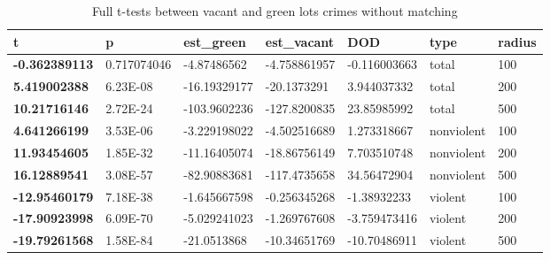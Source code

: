 \documentclass{article}
\begin{document}
\begin{table}[]
\begin{center}
\caption{\label{tab:ab}Full t-tests between vacant and green lots crimes without matching}
\begin{tabular}{lllllll}
\hline
\textbf{t}            & \textbf{p}  & \textbf{est\_green} & \textbf{est\_vacant} & \textbf{DOD} & \textbf{type} & \textbf{radius} \\ \hline
\textbf{-0.362389113} & 0.717074046 & -4.87486562         & -4.758861957         & -0.116003663 & total         & 100             \\
\textbf{5.419002388}  & 6.23E-08    & -16.19329177        & -20.1373291          & 3.944037332  & total         & 200             \\
\textbf{10.21716146}  & 2.72E-24    & -103.9602236        & -127.8200835         & 23.85985992  & total         & 500             \\
\textbf{4.641266199}  & 3.53E-06    & -3.229198022        & -4.502516689         & 1.273318667  & nonviolent    & 100             \\
\textbf{11.93454605}  & 1.85E-32    & -11.16405074        & -18.86756149         & 7.703510748  & nonviolent    & 200             \\
\textbf{16.12889541}  & 3.08E-57    & -82.90883681        & -117.4735658         & 34.56472904  & nonviolent    & 500             \\
\textbf{-12.95460179} & 7.18E-38    & -1.645667598        & -0.256345268         & -1.38932233  & violent       & 100             \\
\textbf{-17.90923998} & 6.09E-70    & -5.029241023        & -1.269767608         & -3.759473416 & violent       & 200             \\
\textbf{-19.79261568} & 1.58E-84    & -21.0513868         & -10.34651769         & -10.70486911 & violent       & 500             
\end{tabular}
\end{center}
\end{table}
\end{document}

